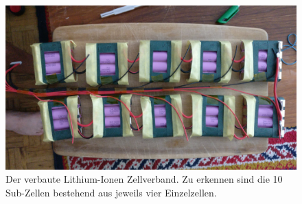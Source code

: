 			\begin{figure}[h]
				\centering
				\includegraphics[width=.9\textwidth]{Footage/Pictures/Battery pack.jpg}
				\caption[Der verbaute Lithium-Ionen Zellverband]{Der verbaute Lithium-Ionen Zellverband. Zu erkennen sind die 10 Sub-Zellen bestehend aus jeweils vier Einzelzellen.}\label{fig:battery pack}
			\end{figure}

